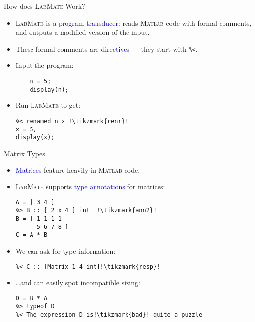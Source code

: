 \documentclass[]{beamer}
\newcommand{\tikzmark}[1]{\tikz[overlay,remember picture,baseline=-0.5ex] \node (#1) {};}
\newcommand{\keyword}[1]{\textcolor{blue}{#1}}
\newcommand{\lm}{\textsc{LabMate}\xspace}
\newcommand{\ma}{\textsc{Matlab}\xspace}
\begin{document}

\begin{frame}[fragile]{How does \lm Work?}
  \begin{itemize}[<+->]
  \item \lm is a \keyword{program transducer}: reads \ma code with formal comments, and outputs a modified version of the input.
    \medskip
  \item These formal comments are \keyword{directives} --- they start with \textcolor{commentgreen}{\texttt{\%<}}.
    \medskip
  \item Input the program:
   \begin{lstlisting}[xleftmargin=2em]
    %> rename n x !\tikzmark{ren}!
    n = 5;
    display(n);
   \end{lstlisting}
  \pause
\item Run \lm to get:
  \begin{lstlisting}[xleftmargin=2em]
%< LabMate 0.2.0.1 !\tikzmark{ver}!
%< renamed n x !\tikzmark{renr}!
x = 5;
display(x);
   \end{lstlisting}
  \pause
\end{itemize}
\end{frame}

\begin{frame}[fragile]{Matrix Types}
  \begin{itemize}[<+->]
  \item \keyword{Matrices} feature heavily in \ma code.
    \medskip
  \item \lm supports \keyword{type annotations} for matrices:
\begin{lstlisting}[xleftmargin=0em, belowskip=-0.5em]
%> A :: [ 1 x 2 ] int  !\tikzmark{ann1}!
A = [ 3 4 ]
%> B :: [ 2 x 4 ] int  !\tikzmark{ann2}!
B = [ 1 1 1 1
      5 6 7 8 ]
C = A * B
\end{lstlisting}
  \pause
  \item We can ask for type information:
\begin{lstlisting}[xleftmargin=0em, belowskip=-0.5em]
%> typeof C !\tikzmark{query}!
%< C :: [Matrix 1 4 int]!\tikzmark{resp}!
\end{lstlisting}
 \pause
  \item \ldots and can easily spot incompatible sizing:
\begin{lstlisting}[xleftmargin=0em]
D = B * A
%> typeof D
%< The expression D is!\tikzmark{bad}! quite a puzzle
\end{lstlisting}
    \pause
\end{itemize}
\end{frame}
\end{document}
